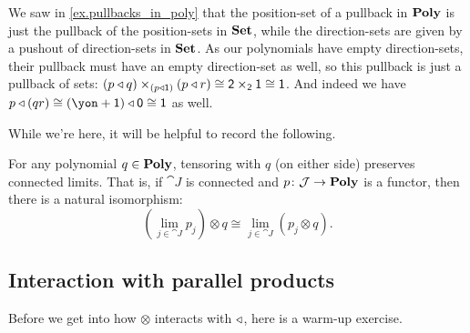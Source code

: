 \documentclass[Book-Poly]{subfiles}
\begin{document}
\begin{exercise}
\begin{solution}
\begin{enumerate}
    We saw in \cref{ex.pullbacks_in_poly} that the position-set of a pullback in $\mathbf{Poly}$ is just the pullback of the position-sets in $\mathbf{Set}$, while the direction-sets are given by a pushout of direction-sets in $\mathbf{Set}$.
    As our polynomials have empty direction-sets, their pullback must have an empty direction-set as well, so this pullback is just a pullback of sets: $(p\mathbin{\triangleleft} q)\times_{(p\mathbin{\triangleleft}\textsf{1})}(p\mathbin{\triangleleft} r) \cong \textsf{2} \times_{\textsf{2}} \textsf{1}\cong\textsf{1}$.
    And indeed we have $p\tri(qr) \iso (\yon+\1)\tri\0 \iso \1$ as well.
\end{enumerate}
\end{solution}
\end{exercise}

While we're here, it will be helpful to record the following.
\begin{proposition} %
For any polynomial $q\in\mathbf{Poly}$, tensoring with $q$ (on either side) preserves connected limits. That is, if $\cat{J}$ is connected and $p\colon \mathcal{J}\to\mathbf{Poly}$ is a functor, then there is a natural isomorphism:
\[
	\left(\lim_{j\in \cat{J}} p_j\right)\otimes q\cong
	\lim_{j\in \cat{J}} (p_j\otimes q).
\]
\end{proposition}


\subsection{Interaction with parallel products} \label{subsec.comon.comp.prop.par}

Before we get into how $\otimes$ interacts with $\mathbin{\triangleleft}$, here is a warm-up exercise.
\end{document}
